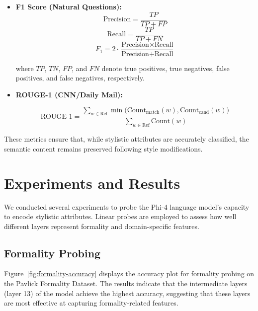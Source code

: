 \documentclass{article}
\begin{document}
\begin{itemize}
    \item \textbf{F1 Score (Natural Questions):}
        \begin{equation}
            \text{Precision} = \frac{TP}{TP + FP}
        \end{equation}
        \begin{equation}
            \text{Recall} = \frac{TP}{TP + FN}
        \end{equation}
        \begin{equation}
            \text{$F_1$} = 2 \cdot \frac{\text{Precision} \times \text{Recall}}{\text{Precision} + \text{Recall}}
        \end{equation}

    where $TP$, $TN$, $FP$, and $FN$ denote true positives, true negatives, false positives, and false negatives, respectively.



    \item \textbf{ROUGE-1 (CNN/Daily Mail):}

        {\small
        \begin{equation}
            \text{ROUGE-1} =
            \frac{
              \sum_{w \in \text{Ref}}
              \min\!\bigl(\text{Count}_{\text{match}}(w), \text{Count}_{\text{cand}}(w)\bigr)
            }{
              \sum_{w \in \text{Ref}}
              \text{Count}(w)
            }
        \end{equation}
        \normalsize}

\end{itemize}

These metrics ensure that, while stylistic attributes are accurately classified, the semantic content remains preserved following style modifications.


\section{Experiments and Results}
We conducted several experiments to probe the Phi-4 language model's capacity to encode stylistic attributes. Linear probes are employed to assess how well different layers represent formality and domain-specific features.


\subsection{Formality Probing}

Figure~\ref{fig:formality-accuracy} displays the accuracy plot for formality probing on the Pavlick Formality Dataset. The results indicate that the intermediate layers (layer 13) of the model achieve the highest accuracy, suggesting that these layers are most effective at capturing formality-related features.
\end{document}
